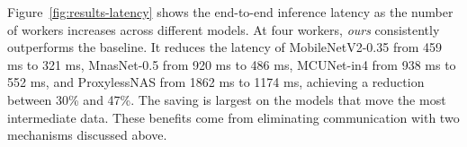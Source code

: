
Figure~\ref{fig:results-latency} shows the end-to-end inference latency as the number of workers increases across different models. At four workers, \emph{ours} consistently outperforms the baseline. It reduces the latency of MobileNetV2-0.35 from 459 ms to 321 ms, MnasNet-0.5 from 920 ms to 486 ms, MCUNet-in4 from 938 ms to 552 ms, and ProxylessNAS from 1862 ms to 1174 ms, achieving a reduction between 30\% and 47\%. The saving is largest on the models that move the most intermediate data. These benefits come from eliminating communication with two mechanisms discussed above.

